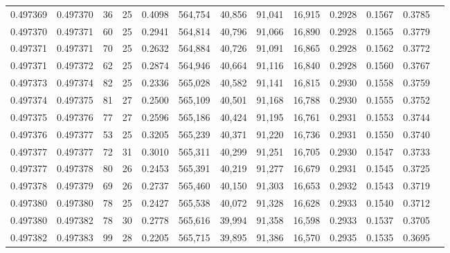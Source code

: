 \begin{tabular}{rrrrrrrrrrrrr}
0.497369 & 0.497370 &  36 &  25 &                                     0.4098 & 564,754 &  40,856 &  91,041 &  16,915 & 0.2928 & 0.1567 & 0.3785 \\
0.497370 & 0.497371 &  60 &  25 &                                     0.2941 & 564,814 &  40,796 &  91,066 &  16,890 & 0.2928 & 0.1565 & 0.3779 \\
0.497371 & 0.497371 &  70 &  25 &                                     0.2632 & 564,884 &  40,726 &  91,091 &  16,865 & 0.2928 & 0.1562 & 0.3772 \\
0.497371 & 0.497372 &  62 &  25 &                                     0.2874 & 564,946 &  40,664 &  91,116 &  16,840 & 0.2928 & 0.1560 & 0.3767 \\
0.497373 & 0.497374 &  82 &  25 &                                     0.2336 & 565,028 &  40,582 &  91,141 &  16,815 & 0.2930 & 0.1558 & 0.3759 \\
0.497374 & 0.497375 &  81 &  27 &                                     0.2500 & 565,109 &  40,501 &  91,168 &  16,788 & 0.2930 & 0.1555 & 0.3752 \\
0.497375 & 0.497376 &  77 &  27 &                                     0.2596 & 565,186 &  40,424 &  91,195 &  16,761 & 0.2931 & 0.1553 & 0.3744 \\
0.497376 & 0.497377 &  53 &  25 &                                     0.3205 & 565,239 &  40,371 &  91,220 &  16,736 & 0.2931 & 0.1550 & 0.3740 \\
0.497377 & 0.497377 &  72 &  31 &                                     0.3010 & 565,311 &  40,299 &  91,251 &  16,705 & 0.2930 & 0.1547 & 0.3733 \\
0.497377 & 0.497378 &  80 &  26 &                                     0.2453 & 565,391 &  40,219 &  91,277 &  16,679 & 0.2931 & 0.1545 & 0.3725 \\
0.497378 & 0.497379 &  69 &  26 &                                     0.2737 & 565,460 &  40,150 &  91,303 &  16,653 & 0.2932 & 0.1543 & 0.3719 \\
0.497380 & 0.497380 &  78 &  25 &                                     0.2427 & 565,538 &  40,072 &  91,328 &  16,628 & 0.2933 & 0.1540 & 0.3712 \\
0.497380 & 0.497382 &  78 &  30 &                                     0.2778 & 565,616 &  39,994 &  91,358 &  16,598 & 0.2933 & 0.1537 & 0.3705 \\
0.497382 & 0.497383 &  99 &  28 &                                     0.2205 & 565,715 &  39,895 &  91,386 &  16,570 & 0.2935 & 0.1535 & 0.3695 \\

\end{tabular}
